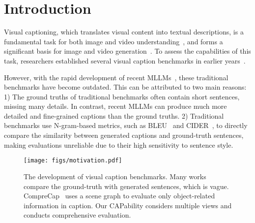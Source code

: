 \section{Introduction}
\label{sec:intro}
Visual captioning, which translates visual content into textual descriptions, is a fundamental task for both image and video understanding~\cite{fang2015captions, xu2015show}, and forms a significant basis for image and video generation~\cite{peebles2023scalable, wang2023modelscope}. To assess the capabilities of this task, researchers established several visual caption benchmarks in earlier years~\cite{mscoco, nocaps, msrvtt, vatex}.

However, with the rapid development of recent MLLMs~\cite{llava, minigpt4, gpt4v, llavaov, gemini1.5, internvl2.5, nvila, videollama3, qwen2.5vl}, these traditional benchmarks have become outdated. This can be attributed to two main reasons: 1) The ground truths of traditional benchmarks often contain short sentences, missing many details. In contrast, recent MLLMs can produce much more detailed and fine-grained captions than the ground truths. 2) Traditional benchmarks use N-gram-based metrics, such as BLEU~\cite{papinesi2002bleu} and CIDER~\cite{vedantam2015cider}, to directly compare the similarity between generated captions and ground-truth sentences, making evaluations unreliable due to their high sensitivity to sentence style.

\begin{figure}[!t]
\centering
\texttt{[image: figs/motivation.pdf]}
\caption{The development of visual caption benchmarks. Many works compare the ground-truth with generated sentences, which is vague. CompreCap~\cite{comprecap} uses a scene graph to evaluate only object-related information in caption. Our CAPability considers multiple views and conducts comprehensive evaluation.}
\label{fig:motivation}
\end{figure}

\begin{table}[!t]
\centering
\caption{Views of our designed dimensions. We can treat a caption from the listed six views, and then split each of them into several dimensions.}
\label{tab:dimensions}
\end{table}

